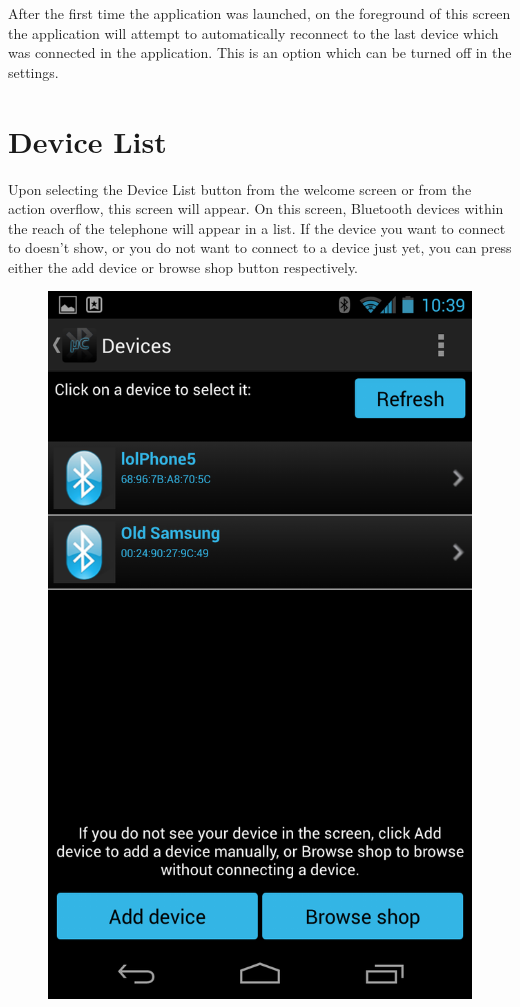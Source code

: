 \newline
After the first time the application was launched, on the foreground of this screen the application will attempt to automatically reconnect to the last device which was connected in the application. This is an option which can be turned off in the settings. 

\chapter{Device List}
Upon selecting the Device List button from the welcome screen or from the action overflow, this screen will appear. On this screen, Bluetooth devices within the reach of the telephone will appear in a list. If the device you want to connect to doesn't show, or you do not want to connect to a device just yet, you can press either the add device or browse shop button respectively.\\
\newline
\begin{figure}[H]
	\centering
	\includegraphics[scale = 0.3]{images/Screenshots/device_list.png}
\end{figure}
